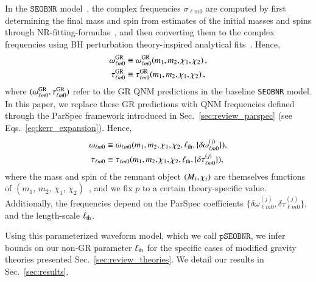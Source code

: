 \documentclass[twocolumn,
               prd,
               aps,
               superscriptaddress,
               tightenlines,
               nofootinbib,
               eqsecnum,
               amsfonts,
               amsmath,
               longbibliography]{revtex4-1}
\newcommand{\pSEOB}{\texttt{pSEOBNR}}
\newcommand{\SEOB}{\texttt{SEOBNR}}
\newcommand{\hs}[1]{{\textcolor{TealBlue}{{#1}}}}
\begin{document}
In the $\SEOB$ model~\cite{Bohe:2016gbl,Cotesta:2018fcv}, the complex frequencies
$\sigma_{\ell m 0}$ are computed by first determining the final mass and spin from
estimates of the initial masses and spins through NR-fitting-formulas~\cite{Taracchini:2013rva,Hofmann:2016yih},
and then converting them to the complex frequencies using BH perturbation
theory-inspired analytical fits~\cite{Berti:2005ys,Berti:2009kk}.
%
Hence,
%
\begin{subequations}
\begin{align}
\omega_{\ell m 0}^{\rm GR} &\equiv \omega^{\rm GR}_{\ell m 0}(m_1, m_2, \chi_1, \chi_2)\,,
\\
\tau _{\ell m 0}^{\rm GR} & \equiv \tau^{\rm GR}_{\ell m 0}(m_1, m_2, \chi_1, \chi_2)\,,
\end{align}
\end{subequations}
%
where $(\omega^{\rm GR}_{\ell m 0}, \tau^{\rm GR}_{\ell m 0})$ refer to the GR QNM predictions in the baseline \SEOB{} model.
In this paper, we replace these GR predictions with QNM
frequencies defined through the ParSpec framework introduced in
Sec.~\ref{sec:review_parspec} (see Eqs.~\eqref{eq:kerr_expansion}). Hence,
%
\begin{subequations}
\begin{align}
\omega_{\ell m 0} & \equiv  \omega_{\ell m 0}(m_1, m_2, \chi_1, \chi_2,\ell_{\rm th}, \{\delta \omega_{\ell m 0}^{(j)}\}),\\
\tau_{\ell m 0}   & \equiv \tau_{\ell m 0} (m_1, m_2, \chi_1, \chi_2, \ell_{\rm th}, \{\delta \tau_{\ell m 0}^{(j)}\}),
\end{align}
\end{subequations}
%
where the mass and spin of the remnant object $(M_{\rm f},\chi_{\rm f})$ are themselves functions of
$(m_1,\, m_2,\, \chi_1,\, \chi_2)$~\cite{Taracchini:2013rva,Hofmann:2016yih}, and we fix $p$
to a certain theory-specific value. Additionally, the frequencies depend on the ParSpec coefficients $\{\delta
\omega_{\ell m 0}^{(j)},\delta \tau_{\ell m 0}^{(j)}\}$, and the length-scale $\ell_{\rm th}$.

Using this parameterized waveform model, which we call $\pSEOB$,
we infer bounds on our non-GR parameter $\ell_{\rm th}$ for the specific cases of
modified gravity theories presented Sec.~\ref{sec:review_theories}.
%
We detail our results in Sec.~\ref{sec:results}.
%
%
%
\end{document}
